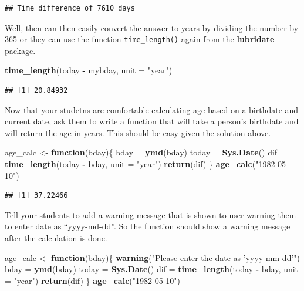 \documentclass[]{book}
\newenvironment{Shaded}{\begin{snugshade}}{\end{snugshade}}
\newcommand{\ControlFlowTok}[1]{\textcolor[rgb]{0.13,0.29,0.53}{\textbf{#1}}}
\newcommand{\DataTypeTok}[1]{\textcolor[rgb]{0.13,0.29,0.53}{#1}}
\newcommand{\KeywordTok}[1]{\textcolor[rgb]{0.13,0.29,0.53}{\textbf{#1}}}
\newcommand{\NormalTok}[1]{#1}
\newcommand{\OperatorTok}[1]{\textcolor[rgb]{0.81,0.36,0.00}{\textbf{#1}}}
\newcommand{\StringTok}[1]{\textcolor[rgb]{0.31,0.60,0.02}{#1}}
\begin{document}
\begin{verbatim}
## Time difference of 7610 days
\end{verbatim}

Well, then can then easily convert the answer to years by dividing the number by 365 or they can use the function \texttt{time\_length()} again from the \textbf{lubridate} package.

\begin{Shaded}
\begin{Highlighting}[]
\KeywordTok{time_length}\NormalTok{(today }\OperatorTok{-}\StringTok{ }\NormalTok{mybday, }\DataTypeTok{unit =} \StringTok{"year"}\NormalTok{)}
\end{Highlighting}
\end{Shaded}

\begin{verbatim}
## [1] 20.84932
\end{verbatim}

Now that your studetns are comfortable calculating age based on a birthdate and current date, ask them to write a function that will take a person's birthdate and will return the age in years. This should be easy given the solution above.

\begin{Shaded}
\begin{Highlighting}[]
\NormalTok{age_calc <-}\StringTok{ }\ControlFlowTok{function}\NormalTok{(bday)\{}
\NormalTok{    bday =}\StringTok{ }\KeywordTok{ymd}\NormalTok{(bday)}
\NormalTok{    today =}\StringTok{ }\KeywordTok{Sys.Date}\NormalTok{()}
\NormalTok{    dif =}\StringTok{ }\KeywordTok{time_length}\NormalTok{(today }\OperatorTok{-}\StringTok{ }\NormalTok{bday, }\DataTypeTok{unit =} \StringTok{"year"}\NormalTok{)}
    \KeywordTok{return}\NormalTok{(dif)}
\NormalTok{\}}
\KeywordTok{age_calc}\NormalTok{(}\StringTok{"1982-05-10"}\NormalTok{)}
\end{Highlighting}
\end{Shaded}

\begin{verbatim}
## [1] 37.22466
\end{verbatim}

Tell your students to add a warning message that is shown to user warning them to enter date as ``yyyy-md-dd''. So the function should show a warning message after the calculation is done.

\begin{Shaded}
\begin{Highlighting}[]
\NormalTok{age_calc <-}\StringTok{ }\ControlFlowTok{function}\NormalTok{(bday)\{}
    \KeywordTok{warning}\NormalTok{(}\StringTok{"Please enter the date as 'yyyy-mm-dd'"}\NormalTok{)}
\NormalTok{    bday =}\StringTok{ }\KeywordTok{ymd}\NormalTok{(bday)}
\NormalTok{    today =}\StringTok{ }\KeywordTok{Sys.Date}\NormalTok{()}
\NormalTok{    dif =}\StringTok{ }\KeywordTok{time_length}\NormalTok{(today }\OperatorTok{-}\StringTok{ }\NormalTok{bday, }\DataTypeTok{unit =} \StringTok{"year"}\NormalTok{)}
    \KeywordTok{return}\NormalTok{(dif)}
\NormalTok{\}}
\KeywordTok{age_calc}\NormalTok{(}\StringTok{"1982-05-10"}\NormalTok{)}
\end{Highlighting}
\end{Shaded}
\end{document}
